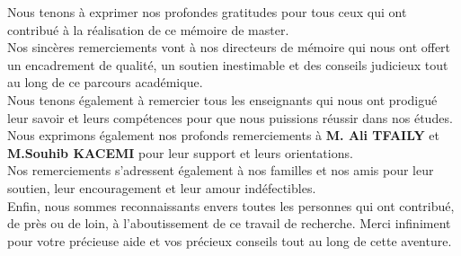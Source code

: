 
Nous tenons à exprimer nos profondes gratitudes pour tous ceux qui ont contribué à la réalisation de ce mémoire de master.\\

Nos sincères remerciements vont à nos directeurs de mémoire qui nous ont offert un encadrement de qualité, un soutien inestimable et des conseils judicieux tout au long de ce parcours académique.\\

Nous tenons également à remercier tous les enseignants qui nous ont prodigué leur savoir et leurs compétences pour que nous puissions réussir dans nos études.\\

Nous exprimons également nos profonds remerciements à \textbf{M. Ali TFAILY} et \textbf{M.Souhib KACEMI} pour leur support et leurs orientations.\\

Nos remerciements s'adressent également à nos familles et nos amis pour leur soutien, leur encouragement et leur amour indéfectibles.\\

Enfin, nous sommes reconnaissants envers toutes les personnes qui ont contribué, de près ou de loin, à l'aboutissement de ce travail de recherche. Merci infiniment pour votre précieuse aide et vos précieux conseils tout au long de cette aventure.






\clearpage